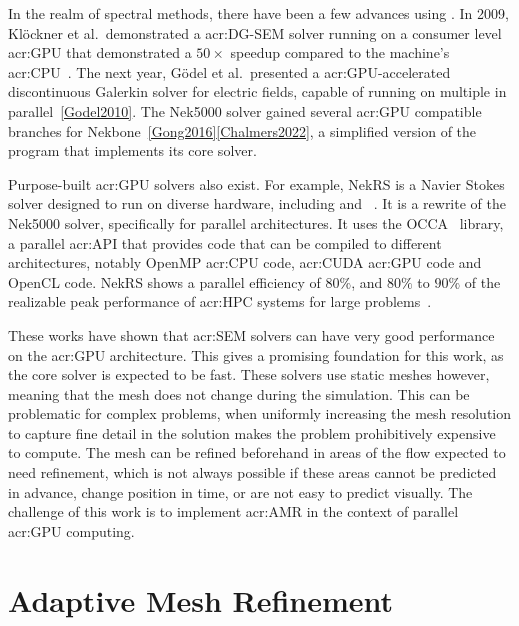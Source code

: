 In the realm of spectral methods, there have been a few advances using . In
2009, Klöckner et al.\ demonstrated a \acrshort{acr:DG-SEM} solver running on a consumer level
\acrshort{acr:GPU} that demonstrated a \(50 \times \) speedup compared to the machine's
\acrshort{acr:CPU}~\cite{Klockner2009}. The next year, Gödel et al.\ presented a
\acrshort{acr:GPU}-accelerated discontinuous Galerkin solver for electric fields, capable of running
on multiple  in parallel~\ref{Godel2010}. The Nek5000 solver gained several
\acrshort{acr:GPU} compatible branches for Nekbone~\ref{Gong2016}\ref{Chalmers2022}, a simplified
version of the program that implements its core solver.

Purpose-built \acrshort{acr:GPU} solvers also exist. For example,  NekRS is a Navier Stokes solver
designed to run on diverse hardware, including  and
~\cite{Fischer2021}. It is a rewrite of the Nek5000 solver, specifically for
parallel architectures. It uses the OCCA~\cite{Medina2014} library, a parallel \acrshort{acr:API}
that provides code that can be compiled to different architectures, notably OpenMP
\acrshort{acr:CPU} code, \acrshort{acr:CUDA} \acrshort{acr:GPU} code and OpenCL code. NekRS shows a
parallel efficiency of \(80 \% \), and \(80 \% \) to \(90 \% \) of the realizable peak performance
of \acrshort{acr:HPC} systems for large problems~\cite{Fischer2021}.

These works have shown that \acrshort{acr:SEM} solvers can have very good performance on the
\acrshort{acr:GPU} architecture. This gives a promising foundation for this work, as the core solver
is expected to be fast. These solvers use static meshes however, meaning that the mesh does not
change during the simulation. This can be problematic for complex problems, when uniformly
increasing the mesh resolution to capture fine detail in the solution makes the problem
prohibitively expensive to compute. The mesh can be refined beforehand in areas of the flow expected
to need refinement, which is not always possible if these areas cannot be predicted in advance,
change position in time, or are not easy to predict visually. The challenge of this work is to
implement \acrlong{acr:AMR} in the context of parallel \acrshort{acr:GPU} computing.

\section{Adaptive Mesh Refinement}\label{section:literature_review:amr}

